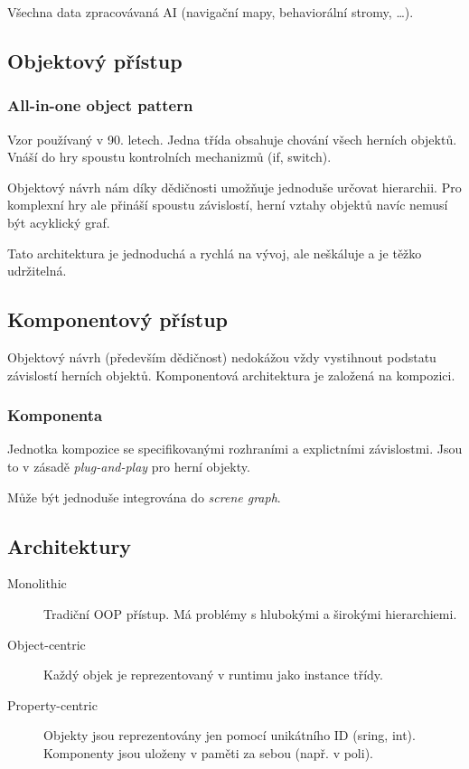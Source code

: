 Všechna data zpracovávaná AI (navigační mapy, behaviorální stromy, \dots).

\subsection*{Objektový přístup}

\subsubsection*{All-in-one object pattern}

Vzor používaný v 90. letech.
Jedna třída obsahuje chování všech herních objektů.
Vnáší do hry spoustu kontrolních mechanizmů (if, switch).

Objektový návrh nám díky dědičnosti umožňuje jednoduše určovat hierarchii.
Pro komplexní hry ale přináší spoustu závislostí, herní vztahy objektů navíc nemusí být acyklický graf.

Tato architektura je jednoduchá a rychlá na vývoj, ale neškáluje a je těžko udržitelná.

\subsection*{Komponentový přístup}

Objektový návrh (především dědičnost) nedokážou vždy vystihnout podstatu závislostí herních objektů.
Komponentová architektura je založená na kompozici.

\subsubsection*{Komponenta}

Jednotka kompozice se specifikovanými rozhraními a explictními závislostmi.
Jsou to v zásadě \textit{plug-and-play} pro herní objekty.

Může být jednoduše integrována do \textit{screne graph}.

\subsection*{Architektury}

\begin{description}
    \item[Monolithic] Tradiční OOP přístup. Má problémy s hlubokými a širokými hierarchiemi.
    \item[Object-centric] Každý objek je reprezentovaný v runtimu jako instance třídy.
    \item[Property-centric] Objekty jsou reprezentovány jen pomocí unikátního ID (sring, int). Komponenty jsou uloženy v paměti za sebou (např. v poli).
\end{description}

